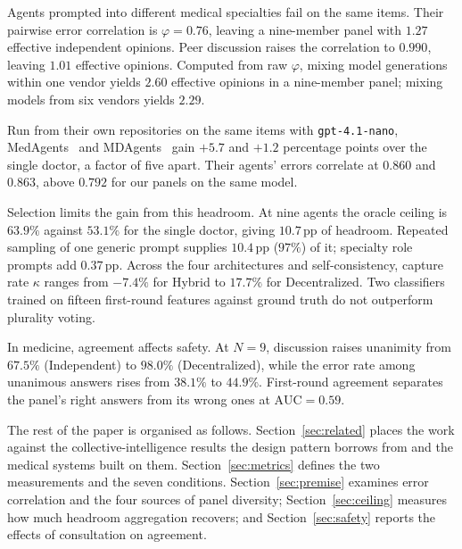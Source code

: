 Agents prompted into different medical specialties fail on the same items. Their pairwise error
correlation is $\varphi = 0.76$, leaving a nine-member panel with $1.27$ effective independent
opinions. Peer discussion raises the correlation to $0.990$, leaving $1.01$ effective opinions.
Computed from raw $\varphi$, mixing model generations within one vendor yields $2.60$ effective
opinions in a nine-member panel; mixing models from six vendors yields $2.29$.

Run from their own repositories on the same items with \texttt{gpt-4.1-nano},
MedAgents~\citep{tang2024medagents} and MDAgents~\citep{kim2024mdagents} gain $+5.7$ and
$+1.2$ percentage points over the single doctor, a factor of five apart. Their agents' errors
correlate at $0.860$ and $0.863$, above $0.792$ for our panels on the same model.

Selection limits the gain from this headroom. At nine agents the oracle ceiling is $63.9\%$
against $53.1\%$ for the single doctor, giving $10.7$\,pp of headroom. Repeated sampling of one generic prompt supplies
$10.4$\,pp ($97\%$) of it; specialty role prompts add $0.37$\,pp. Across the four
architectures and self-consistency, capture rate $\kappa$ ranges from $-7.4\%$ for Hybrid to
$17.7\%$ for Decentralized. Two classifiers trained on fifteen first-round features against ground truth do not outperform
plurality voting.

In medicine, agreement affects safety. At $N{=}9$, discussion raises unanimity from $67.5\%$
(Independent) to $98.0\%$ (Decentralized), while the error rate among unanimous answers rises
from $38.1\%$ to $44.9\%$. First-round agreement separates the panel's right answers from
its wrong ones at $\text{AUC} = 0.59$.

The rest of the paper is organised as follows. Section~\ref{sec:related} places the work against
the collective-intelligence results the design pattern borrows from and the medical systems built
on them. Section~\ref{sec:metrics} defines the two measurements and the seven conditions.
Section~\ref{sec:premise} examines error correlation and the four sources of panel diversity;
Section~\ref{sec:ceiling} measures how much headroom aggregation recovers; and
Section~\ref{sec:safety} reports the effects of consultation on agreement.
